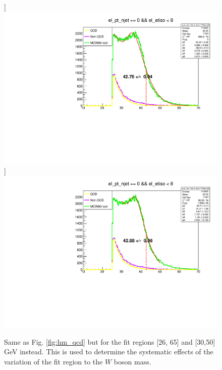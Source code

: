 \documentclass[a4paper]{report}
\numberwithin{equation}{section}
\begin{document}
\begin{figure}[htb!]
	\centering
	\subfloat[Fit Region: [26, 65]]{{\includegraphics[width=0.47\columnwidth]{hm_fit2665.pdf}}}
	\quad
	\centering
	\subfloat[Fit Region: [30, 50]]{{\includegraphics[width=0.47\columnwidth]{hm_fit3050.pdf}}}
	\caption{Same as Fig. \ref{fig:hm_qcd} but for the fit regions [26, 65] and [30,50] GeV instead. This is used to determine 
    the systematic effects of the variation of the fit region to the $W$ boson mass.}
	\label{fig:hm_fit}
\end{figure}
\end{document}
